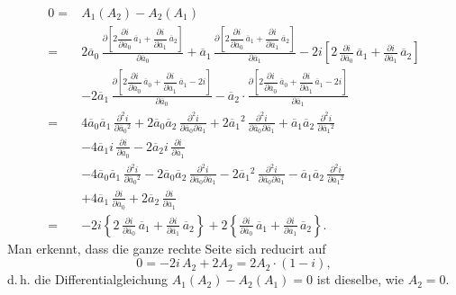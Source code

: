 \documentclass[11pt]{article}
\providecommand{\weberpage}[1]{}
\begin{document}
\weberpage{123}
\[
\begin{aligned}
0 = {}& A_1(A_2) - A_2(A_1)\\
= {}& 2\overline{a}_0\,\frac{\partial\left[2\dfrac{\partial i}{\partial \overline{a}_0}\,\overline{a}_1 + \dfrac{\partial i}{\partial \overline{a}_1}\,\overline{a}_2\right]}{\partial \overline{a}_0} + \overline{a}_1\,\frac{\partial\left[2\dfrac{\partial i}{\partial \overline{a}_0}\,\overline{a}_1 + \dfrac{\partial i}{\partial \overline{a}_1}\,\overline{a}_2\right]}{\partial \overline{a}_1} - 2i\left[2\,\frac{\partial i}{\partial \overline{a}_0}\,\overline{a}_1 + \frac{\partial i}{\partial \overline{a}_1}\,\overline{a}_2\right]\\
& - 2\overline{a}_1\,\frac{\partial\left[2\dfrac{\partial i}{\partial \overline{a}_0}\,\overline{a}_0 + \dfrac{\partial i}{\partial \overline{a}_1}\,\overline{a}_1 - 2i\right]}{\partial \overline{a}_0} - \overline{a}_2\cdot\frac{\partial\left[2\dfrac{\partial i}{\partial \overline{a}_0}\,\overline{a}_0 + \dfrac{\partial i}{\partial \overline{a}_1}\,\overline{a}_1 - 2i\right]}{\partial \overline{a}_1}\\
= {}& 4\overline{a}_0\overline{a}_1\,\frac{\partial^2 i}{\partial \overline{a}_0{}^2} + 2\overline{a}_0\overline{a}_2\,\frac{\partial^2 i}{\partial \overline{a}_0 \partial \overline{a}_1} + 2\overline{a}_1{}^2\,\frac{\partial^2 i}{\partial \overline{a}_0 \partial \overline{a}_1} + \overline{a}_1\overline{a}_2\,\frac{\partial^2 i}{\partial \overline{a}_1{}^2}\\
& - 4\overline{a}_1 i\,\frac{\partial i}{\partial \overline{a}_0} - 2\overline{a}_2 i\,\frac{\partial i}{\partial \overline{a}_1}\\
& - 4\overline{a}_0\overline{a}_1\,\frac{\partial^2 i}{\partial \overline{a}_0{}^2} - 2\overline{a}_0\overline{a}_2\,\frac{\partial^2 i}{\partial \overline{a}_0 \partial \overline{a}_1} - 2\overline{a}_1{}^2\,\frac{\partial^2 i}{\partial \overline{a}_0 \partial \overline{a}_1} - \overline{a}_1\overline{a}_2\,\frac{\partial^2 i}{\partial \overline{a}_1{}^2}\\
& + 4\overline{a}_1\,\frac{\partial i}{\partial \overline{a}_0} + 2\overline{a}_2\,\frac{\partial i}{\partial \overline{a}_1}\\
= {}& -2i\left\{2\,\frac{\partial i}{\partial \overline{a}_0}\,\overline{a}_1 + \frac{\partial i}{\partial \overline{a}_1}\,\overline{a}_2\right\} + 2\left\{\frac{\partial i}{\partial \overline{a}_0}\,\overline{a}_1 + \frac{\partial i}{\partial \overline{a}_1}\,\overline{a}_2\right\}.
\end{aligned}
\]
Man erkennt, dass die ganze rechte Seite sich reducirt auf
\[
0 = -2i\,A_2 + 2A_2 = 2A_2\cdot(1-i),
\]
d.\,h. die Differentialgleichung $A_1(A_2) - A_2(A_1) = 0$ ist dieselbe, wie
$A_2 = 0$.
\end{document}
